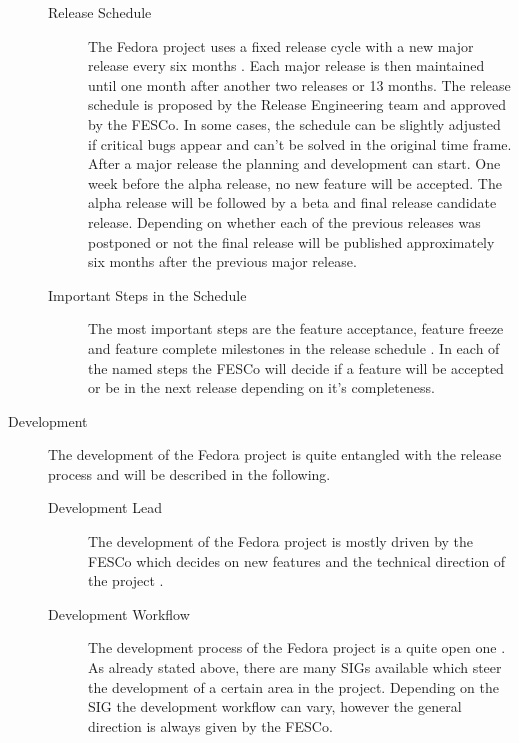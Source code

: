 \begin{description}
\begin{description}
    \item[Release Schedule] The Fedora project uses a fixed release cycle with
      a new major release every six months
      \cite{FedoraLifeCycle,FedoraReleaseEngineering}. Each major release is
      then maintained until one month after another two releases or 13 months.
      The release schedule is proposed by the Release Engineering team and
      approved by the \ac{FESCo}. In some cases, the schedule can be slightly
      adjusted if critical bugs appear and can't be solved in the original time
      frame. After a major release the planning and development can start. One
      week before the alpha release, no new feature will be accepted. The alpha
      release will be followed by a beta and final release candidate release.
      Depending on whether each of the previous releases was postponed or not
      the final release will be published approximately six months after the
      previous major release.

    \item[Important Steps in the Schedule] The most important steps are the
      feature acceptance, feature freeze and feature complete milestones in the
      release schedule \cite{FedoraLifeCycle}. In each of the named steps the
      \ac{FESCo} will decide if a feature will be accepted or be in the next
      release depending on it's completeness.

  \end{description}

  \item[Development] The development of the Fedora project is quite entangled
    with the release process and will be described in the following.

  \begin{description}

    \item[Development Lead] The development of the Fedora project is mostly
      driven by the \ac{FESCo} which decides on new features and the technical
      direction of the project \cite{FedoraFESCo}.

    \item[Development Workflow] The development process of the Fedora project
      is a quite open one \cite{FedoraReleaseEngineering,FedoraSIG}. As already
      stated above, there are many \acp{SIG} available which steer the
      development of a certain area in the project. Depending on the \ac{SIG}
      the development workflow can vary, however the general direction is
      always given by the \ac{FESCo}.


\end{description}
\end{description}
